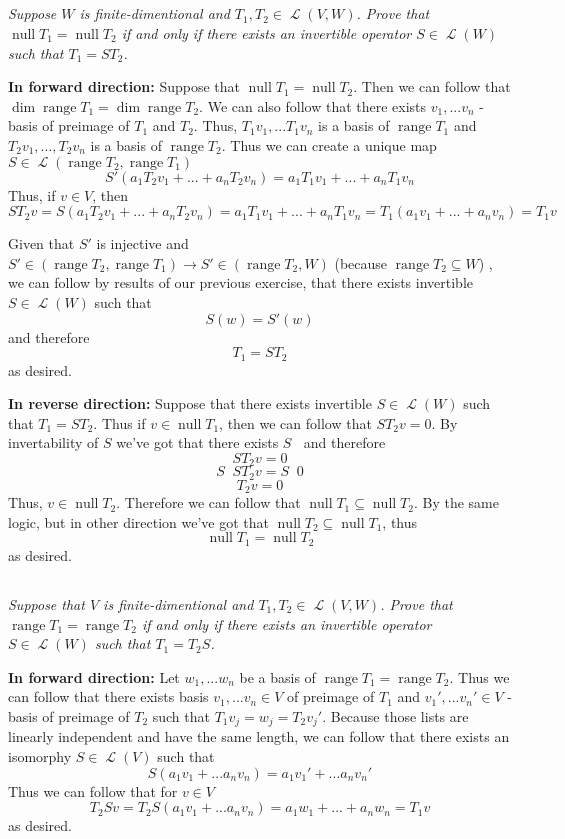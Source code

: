 \documentclass[11pt,oneside,titlepage]{book}
\DeclareMathOperator \map {\mathcal {L}}
\DeclareMathOperator \ns {null}
\DeclareMathOperator \range {range}
\DeclareMathOperator \inv {^{-1}}
\begin{document}
\subsection{}

\textit{Suppose $W$ is finite-dimentional and $T_1, T_2 \in \map(V, W)$. Prove that
  $\ns T_1 = \ns T_2$ if and only if there exists an invertible operator $S \in \map(W)$ such that
  $T_1 = S T_2$.}

\textbf{In forward direction: }
Suppose that $\ns T_1 = \ns T_2$. Then we can follow that $\dim \range T_1 = \dim \range T_2$.
We can also follow that there exists $v_1, ... v_n$ - basis of preimage of $T_1$ and $T_2$.
Thus, $T_1 v_1, ... T_1 v_n$ is a basis of $\range T_1$ and $T_2 v_1, ..., T_2 v_n$ is a
basis of $\range T_2$. Thus we can create a unique map $S \in \map(\range T_2, \range T_1)$
$$S'(a_1 T_2 v_1 +  ... +  a_n T_2 v_n) = a_1 T_1 v_1 +  ... +  a_n T_1 v_n$$
Thus, if $v \in V$, then
$$S T_2 v = S (a_1 T_2 v_1 + ... + a_n T_2 v_n) = a_1 T_1 v_1 + ... + a_n T_1 v_n =
T_1(a_1 v_1 + ... + a_n v_n) = T_1 v$$

Given that $S'$ is injective and $S' \in (\range T_2, \range T_1) \to S' \in (\range T_2, W)$
(because $\range T_2 \subseteq W$) , we can follow by results of our previous exercise, that there
exists invertible  $S \in \map (W)$ such that
$$S(w) = S'(w)$$
and therefore
$$T_1 = S T_2$$
as desired.

\textbf{In reverse direction: }
Suppose that there exists invertible $S \in \map(W)$ such that $T_1 = S T_2$.
Thus if $v \in \ns T_1$, then we can follow that $S T_2 v = 0$. By invertability of $S$ we've got
that there exists $S \inv$ and therefore
$$S T_2 v = 0$$
$$S \inv S T_2 v = S \inv 0$$
$$T_2 v = 0$$
Thus, $v \in \ns T_2$. Therefore we can follow that $\ns T_1 \subseteq \ns T_2$. By the same
logic, but in other direction we've got that $\ns T_2 \subseteq \ns T_1$, thus
$$\ns T_1 = \ns T_2$$
as desired.


\subsection{}

\textit{Suppose that $V$ is finite-dimentional and $T_1, T_2 \in \map(V, W)$. Prove that
  $\range T_1 = \range T_2$ if and only if there exists an invertible operator $S \in \map (W)$
  such that $T_1 = T_2 S$.}

\textbf{In forward direction: }
Let $w_1, ... w_n$ be a basis of $\range T_1 = \range T_2$. Thus we can follow that there exists
basis $v_1, ... v_n \in V$ of preimage of $T_1$  and $v_1', ... v_n' \in V$  - basis of preimage
of $T_2$ such that $T_1 v_j = w_j = T_2 v_j'$.
Because those lists are linearly independent and have the same length, we
can follow that there exists an isomorphy $S \in \map (V)$ such that
$$S(a_1 v_1 + ... a_n v_n) = a_1 v_1' + ... a_n v_n'$$
Thus we can follow that for $v \in V$
$$T_2 S v = T_2 S (a_1 v_1 + ... a_n v_n) = a_1 w_1 + ... + a_n w_n = T_1 v$$
as desired.
\end{document}
